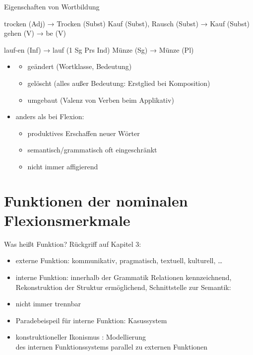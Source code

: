 \begin{frame}
  {Eigenschaften von Wortbildung}
  \pause
  \begin{exe}
    \ex
    \begin{xlist}
      \ex trocken (Adj) → \alert{Trocken} (Subst)
      \ex Kauf (Subst), Rausch (Subst) → \alert{Kauf} (Subst)
      \ex gehen (V) → \alert{be} (V)
    \end{xlist}
    \pause
    \ex
    \begin{xlist}
      \ex lauf-en (Inf) → \alert{lauf} (1 Sg Prs Ind)
      \ex Münze (Sg) → \alert{Münze} (Pl)
    \end{xlist}
  \end{exe}
  \pause
  \Halbzeile
  \begin{itemize}[<+->]
    \item {}
      \begin{itemize}[<+->]
        \item geändert (Wortklasse, Bedeutung)
        \item gelöscht (alles außer Bedeutung: Erstglied bei Komposition)
        \item umgebaut (Valenz von Verben beim Applikativ)
      \end{itemize}
  \Halbzeile
    \item anders als bei Flexion:
      \begin{itemize}
        \item \alert{produktives Erschaffen neuer Wörter}
        \item semantisch\slash grammatisch oft eingeschränkt
        \item nicht immer affigierend
      \end{itemize}
  \end{itemize}
\end{frame}

\section{Funktionen der nominalen Flexionsmerkmale}

\begin{frame}
  {Was heißt Funktion?}
  \pause
  Rückgriff auf Kapitel 3:
  \pause
  \Halbzeile
  \begin{itemize}[<+->]
    \item \alert{externe} Funktion: kommunikativ, pragmatisch, textuell, kulturell, \dots
    \item \alert{interne} Funktion: innerhalb der Grammatik Relationen kennzeichnend,
      Rekonstruktion der Struktur ermöglichend, Schnittstelle zur Semantik: 
    \item nicht immer trennbar
      \Halbzeile
    \item Paradebeispeil für interne Funktion: \alert{Kasussystem}
      \Halbzeile
    \item konstruktioneller Ikonismus \citep{Eisenberg2013a}: Modellierung\\
      des internen Funktionssystems parallel zu externen Funktionen
  \end{itemize}
\end{frame}

